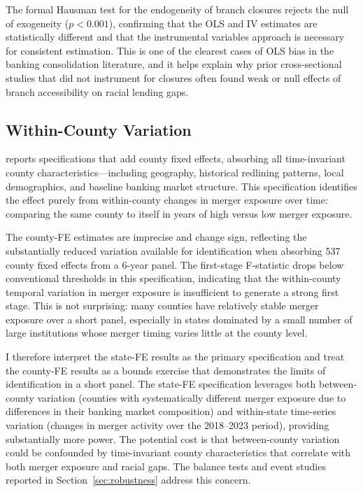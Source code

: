 \documentclass[12pt]{article}
\begin{document}
The formal Hausman test for the endogeneity of branch closures rejects the null of exogeneity ($p < 0.001$), confirming that the OLS and IV estimates are statistically different and that the instrumental variables approach is necessary for consistent estimation. This is one of the clearest cases of OLS bias in the banking consolidation literature, and it helps explain why prior cross-sectional studies that did not instrument for closures often found weak or null effects of branch accessibility on racial lending gaps.



\subsection{Within-County Variation}

 reports specifications that add county fixed effects, absorbing all time-invariant county characteristics---including geography, historical redlining patterns, local demographics, and baseline banking market structure. This specification identifies the effect purely from within-county changes in merger exposure over time: comparing the same county to itself in years of high versus low merger exposure.

The county-FE estimates are imprecise and change sign, reflecting the substantially reduced variation available for identification when absorbing 537 county fixed effects from a 6-year panel. The first-stage F-statistic drops below conventional thresholds in this specification, indicating that the within-county temporal variation in merger exposure is insufficient to generate a strong first stage. This is not surprising: many counties have relatively stable merger exposure over a short panel, especially in states dominated by a small number of large institutions whose merger timing varies little at the county level.

I therefore interpret the state-FE results as the primary specification and treat the county-FE results as a bounds exercise that demonstrates the limits of identification in a short panel. The state-FE specification leverages both between-county variation (counties with systematically different merger exposure due to differences in their banking market composition) and within-state time-series variation (changes in merger activity over the 2018--2023 period), providing substantially more power. The potential cost is that between-county variation could be confounded by time-invariant county characteristics that correlate with both merger exposure and racial gaps. The balance tests and event studies reported in Section~\ref{sec:robustness} address this concern.
\end{document}
